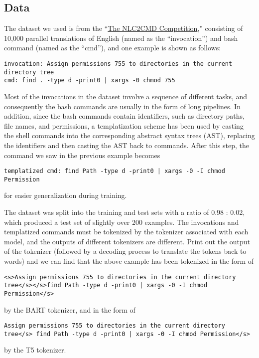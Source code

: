 \subsection{Data}
The dataset we used is from the
``\href{https://nlc2cmd.us-east.mybluemix.net/}{The NLC2CMD Competition},''
consisting of 10,000 parallel translations of English (named as the
``invocation'') and bash command (named as the ``cmd''), and one example is
shown as follows:

\begin{verbatim}
invocation: Assign permissions 755 to directories in the current directory tree
cmd: find . -type d -print0 | xargs -0 chmod 755
\end{verbatim}


Most of the invocations in the dataset involve a sequence of
different tasks, and consequently the bash commands are usually in the form of
long pipelines. In addition, since the bash commands contain identifiers, such
as directory paths, file names, and permissions, a templatization scheme has
been used by casting the shell commands into the corresponding abstract syntax
trees (AST), replacing the identifiers and then casting the AST back to
commands. After this step, the
command we saw in the previous example becomes
\begin{verbatim}
templatized cmd: find Path -type d -print0 | xargs -0 -I chmod Permission
\end{verbatim}
for easier generalization during training.

The dataset was split into the training and test sets with a ratio of 0.98 : 0.02, which produced a test set of slightly over 200 examples. The invocations and templatized commands must be tokenized by the tokenizer associated with each model, and the outputs of different tokenizers are different. Print out the output of the tokenizer (followed by a decoding process to translate the tokens back to words) and we can find that the above example has been tokenized in the form of
\begin{verbatim}
<s>Assign permissions 755 to directories in the current directory 
tree</s></s>find Path -type d -print0 | xargs -0 -I chmod Permission</s>
\end{verbatim}
by the BART tokenizer, and in the form of
\begin{verbatim}
Assign permissions 755 to directories in the current directory 
tree</s> find Path -type d -print0 | xargs -0 -I chmod Permission</s>
\end{verbatim}
by the T5 tokenizer.

